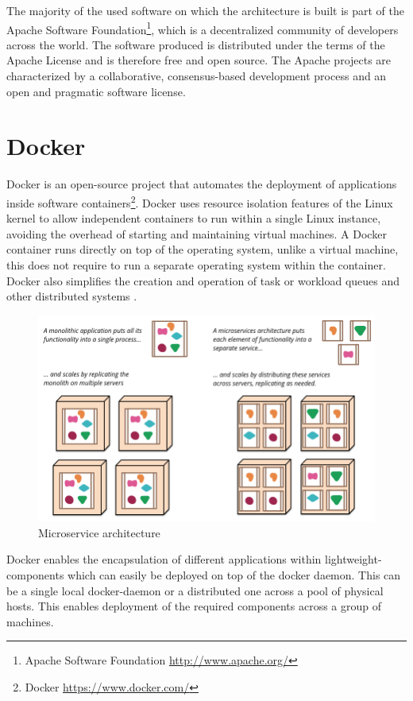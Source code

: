 The majority of the used software on which the architecture is built is part of the Apache Software Foundation\footnote{Apache Software Foundation \url{http://www.apache.org/}}, which is a decentralized community of developers across the world. The software produced is distributed under the terms of the Apache License and is therefore free and open source. The Apache projects are characterized by a collaborative, consensus-based development process and an open and pragmatic software license.

\section{Docker \label{subsec_docker}}

Docker is an open-source project that automates the deployment of applications inside software containers\footnote{Docker \url{https://www.docker.com/}}. Docker uses resource isolation features of the Linux kernel to allow independent containers to run within a single Linux instance, avoiding the overhead of starting and maintaining virtual machines. A Docker container runs directly on top of the operating system, unlike a virtual machine, this does not require to run a separate operating system within the container. Docker also simplifies the creation and operation of task or workload queues and other distributed systems \cite{docker1,docker2}.

\begin{figure}[ht!]
\centering
\includegraphics[width=\textwidth]{figures/microservice.png}
\caption{Microservice architecture \cite{microservice} \label{fig:microservice}}
\end{figure}

Docker enables the encapsulation of different applications within lightweight-components which can easily be deployed on top of the docker daemon. This can be a single local docker-daemon or a distributed one across a pool of physical hosts. This enables deployment of the required components across a group of machines.

